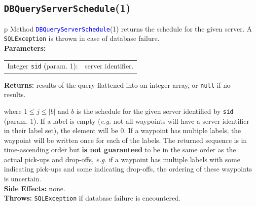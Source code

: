 \subsection{{\tt{}\protect{}DBQueryServerSchedule}(1)}
\begin{tabular}{p{\textwidth}}
\toprule
{}
Method \textcolor{blue}{{\tt{}\protect{}DBQueryServerSchedule}}(1) returns the schedule
for the given server.
A {\tt{}SQLException} is thrown in case of database failure.\\
\midrule
\textbf{Parameters:} \\
\begin{tabular}{lp{116mm}}
Integer {\tt{}sid} (param. 1):&server identifier.\\
\end{tabular}
\textbf{Returns:} results of the query flattened into an integer array,
or {\tt{}null} if no results.


where $1\leq j\leq |b|$ and $b$ is the schedule for the
given server  identified by {\tt{}sid} (param. 1).
If a label is empty (\textit{e.g.} not all waypoints will have a server
identifier in their label set), the element will be 0. If a waypoint has
multiple labels, the waypoint will be written once for each of the labels.
The returned sequence is in time-ascending order but \textbf{is not guaranteed}
to be in the same order as the actual pick-ups and drop-offs, \textit{e.g.} if a
waypoint has multiple labels with some indicating pick-ups and some indicating
drop-offs, the ordering of these waypoints is uncertain.\\
\textbf{Side Effects:} none.\\
\textbf{Throws:} {\tt{}SQLException} if database failure is encountered.\\
\bottomrule
\end{tabular}
\nwenddocs{}\endmoddef{}

